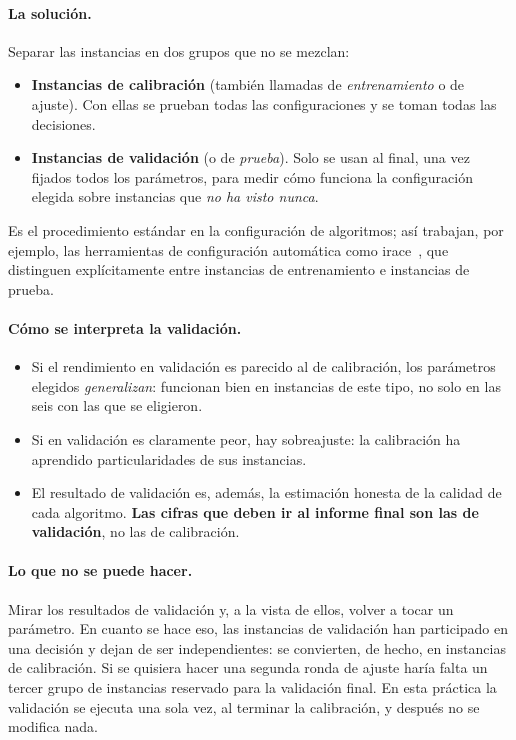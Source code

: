 \paragraph{La solución.} Separar las instancias en dos grupos que no se mezclan:
\begin{itemize}
  \item \textbf{Instancias de calibración} (también llamadas de \emph{entrenamiento} o de
        ajuste). Con ellas se prueban todas las configuraciones y se toman todas las
        decisiones.
  \item \textbf{Instancias de validación} (o de \emph{prueba}). Solo se usan al final, una
        vez fijados todos los parámetros, para medir cómo funciona la configuración elegida
        sobre instancias que \emph{no ha visto nunca}.
\end{itemize}
Es el procedimiento estándar en la configuración de algoritmos; así trabajan, por ejemplo,
las herramientas de configuración automática como irace~\cite{irace}, que distinguen
explícitamente entre instancias de entrenamiento e instancias de prueba.

\paragraph{Cómo se interpreta la validación.}
\begin{itemize}
  \item Si el rendimiento en validación es parecido al de calibración, los parámetros
        elegidos \emph{generalizan}: funcionan bien en instancias de este tipo, no solo en
        las seis con las que se eligieron.
  \item Si en validación es claramente peor, hay sobreajuste: la calibración ha aprendido
        particularidades de sus instancias.
  \item El resultado de validación es, además, la estimación honesta de la calidad de cada
        algoritmo. \textbf{Las cifras que deben ir al informe final son las de validación},
        no las de calibración.
\end{itemize}

\paragraph{Lo que no se puede hacer.} Mirar los resultados de validación y, a la vista de
ellos, volver a tocar un parámetro. En cuanto se hace eso, las instancias de validación han
participado en una decisión y dejan de ser independientes: se convierten, de hecho, en
instancias de calibración. Si se quisiera hacer una segunda ronda de ajuste haría falta un
tercer grupo de instancias reservado para la validación final. En esta práctica la
validación se ejecuta una sola vez, al terminar la calibración, y después no se modifica
nada.

